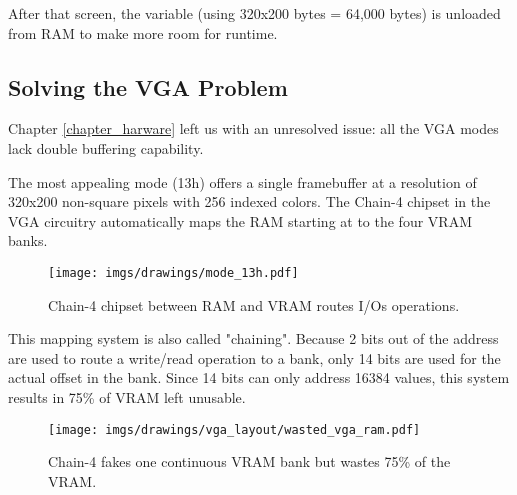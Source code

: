 \documentclass[book.tex]{subfiles}
\begin{document}
\begin{minipage}{\textwidth}

\end{minipage}
After that screen, the  variable (using 320x200 bytes = 64,000 bytes) is unloaded from RAM to make more room for runtime.\\
\par




















\subsection{Solving the VGA Problem}
Chapter \ref{chapter_harware}  left us with an unresolved issue: all the VGA modes lack double buffering capability.\\
\par
 The most appealing mode (13h) offers a single framebuffer at a resolution of 320x200 non-square pixels with 256 indexed colors. The Chain-4 chipset in the VGA circuitry automatically maps the RAM starting at  to the four VRAM banks. 
 \par
 \begin{figure}[H]
\centering
      \texttt{[image: imgs/drawings/mode\_13h.pdf]}
      \caption{Chain-4 chipset between RAM and VRAM routes I/Os operations.}
\end{figure}

This mapping system is also called "chaining". Because 2 bits out of the address are used to route a write/read operation to a bank, only 14 bits are used for the actual offset in the bank. Since 14 bits can only address 16384 values, this system results in 75\% of VRAM left unusable.\\

\begin{figure}[H]
\centering
 \texttt{[image: imgs/drawings/vga\_layout/wasted\_vga\_ram.pdf]}
  \caption{Chain-4 fakes one continuous VRAM bank but wastes 75\% of the VRAM.}
 \end{figure}
\end{document}
